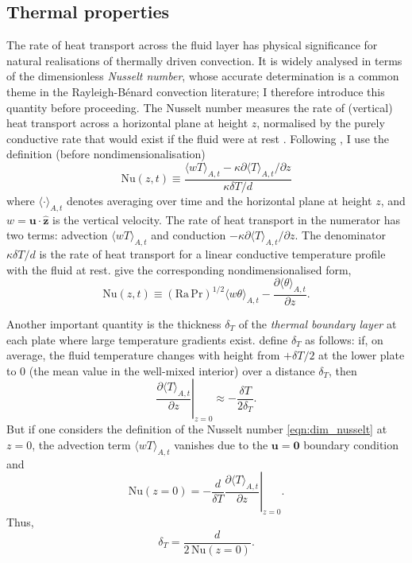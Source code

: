 \documentclass[titlepage,twoside]{article}
\numberwithin{equation}{section}
\newcommand{\pdiff}[2]{\frac{\partial #1}{\partial #2}}
\renewcommand\vec{\bm}
\newcommand{\uvec}[1]{\vec{\hat{#1}}}
\newcommand{\prandtl}{\ensuremath{\mathrm{Pr}}}
\newcommand{\rayleigh}{\ensuremath{\mathrm{Ra}}}
\newcommand{\nusselt}{\ensuremath{\mathrm{Nu}}}
\newcommand{\rb}{Rayleigh-B\'{e}nard}
\begin{document}
\subsection{Thermal properties}
The rate of heat transport across the fluid layer has physical significance for
natural realisations of thermally driven convection. It is widely analysed in
terms of the dimensionless \emph{Nusselt number}, whose accurate determination
is a common theme in the \rb{} convection literature; I therefore introduce
this quantity before proceeding. The Nusselt number measures the rate of
(vertical) heat transport across a horizontal plane at height $z$, normalised
by the purely conductive rate that would exist if the fluid were at rest
\parencite{verzicco1999}. Following \textcite{chilla2012}, I use the definition
(before nondimensionalisation)
\begin{equation}
    \label{eqn:dim_nusselt}
    \nusselt(z,t) \equiv \frac{
        \langle wT \rangle_{A,t}
        - \kappa \partial \langle T \rangle_{A,t} / \partial z
    }{
        \kappa \delta T / d
    }
\end{equation}
where $\langle \cdot \rangle_{A,t}$ denotes averaging over time and the
horizontal plane at height $z$, and $w = \vec{u} \cdot \uvec{z}$ is the
vertical velocity. The rate of heat transport in the numerator has two terms:
advection $\langle wT \rangle_{A,t}$ and conduction $-\kappa \partial \langle T
\rangle_{A,t} / \partial z$. The denominator $\kappa \delta T / d$ is the rate
of heat transport for a linear conductive temperature profile with the fluid at
rest. \textcite{scheel2013} give the corresponding nondimensionalised form,
\begin{equation}
    \label{eqn:nusselt}
    \nusselt(z,t) \equiv (\rayleigh\,\prandtl)^{1/2}
        \langle w \theta \rangle_{A,t}
        - \pdiff{\langle \theta \rangle_{A,t}}{z}.
\end{equation}

Another important quantity is the thickness $\delta_T$ of the \emph{thermal
boundary layer} at each plate where large temperature gradients exist.
\textcite{chilla2012} define $\delta_T$ as follows: if, on average, the fluid
temperature changes with height from $+\delta T/2$ at the lower plate to $0$
(the mean value in the well-mixed interior) over a distance $\delta_T$, then
\[
    \left. \pdiff{\langle T \rangle_{A,t}}{z} \right|_{z=0}
        \approx -\frac{\delta T}{2 \delta_T}.
\]
But if one considers the definition of the Nusselt number
\cref{eqn:dim_nusselt} at $z=0$, the advection term $\langle wT \rangle_{A,t}$
vanishes due to the $\vec{u} = \vec{0}$ boundary condition and
\[
    \nusselt(z=0) = -\frac{d}{\delta T}
        \left. \pdiff{\langle T \rangle_{A,t}}{z} \right|_{z=0}.
\]
Thus,
\begin{equation}
    \label{eqn:thermal_bl}
    \delta_T = \frac{d}{2\,\nusselt(z=0)}.
\end{equation}
\end{document}

